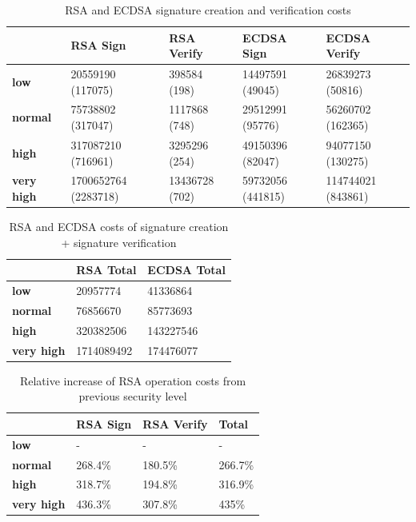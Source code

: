 \documentclass{llncs}
\begin{document}
\begin{table}[]
  \begin{tabular}{|l|l|l|l|l|}
  \hline
                    & \textbf{RSA Sign}    & \textbf{RSA Verify} & \textbf{ECDSA Sign} & \textbf{ECDSA Verify} \\ \hline
  \textbf{low}       & 20559190 (117075)    & 398584 (198)        & 14497591 (49045)    & 26839273 (50816)      \\ \hline
  \textbf{normal}    & 75738802 (317047)    & 1117868 (748)       & 29512991 (95776)    & 56260702 (162365)     \\ \hline
  \textbf{high}      & 317087210 (716961)   & 3295296 (254)       & 49150396 (82047)     & 94077150 (130275)     \\ \hline
  \textbf{very high} & 1700652764 (2283718) & 13436728 (702)      & 59732056 (441815)   & 114744021 (843861)    \\ \hline
  \end{tabular}
  \centering \caption{\label{table:rsa-costs-all-sls} RSA and ECDSA signature creation and verification costs} \end{table}

\begin{table}[]
  \begin{tabular}{|l|l|l|}
                     & \textbf{RSA Total} & \textbf{ECDSA Total} \\ \hline
  \textbf{low}       & 20957774           & 41336864             \\ \hline
  \textbf{normal}    & 76856670           & 85773693             \\ \hline
  \textbf{high}      & 320382506          & 143227546            \\ \hline
  \textbf{very high} & 1714089492         & 174476077
  \end{tabular}
  \centering \caption{\label{table:rsa-costs-all-sls-total} RSA and ECDSA costs of signature creation + signature verification}
\end{table}

\begin{table}[]
\begin{tabular}{|l|l|l|l|}
                   & \textbf{RSA Sign} & \textbf{RSA Verify} & \textbf{Total} \\ \hline
\textbf{low}       & -                 & -                   & -              \\ \hline
\textbf{normal}    & 268.4\%           & 180.5\%             & 266.7\%        \\ \hline
\textbf{high}      & 318.7\%           & 194.8\%             & 316.9\%        \\ \hline
\textbf{very high} & 436.3\%           & 307.8\%             & 435\%          \\ \hline
\end{tabular}
\centering \caption{\label{table:rsa-pub-priv-cost-increasee} Relative increase of RSA operation costs from previous security level}
\end{table}
\end{document}
